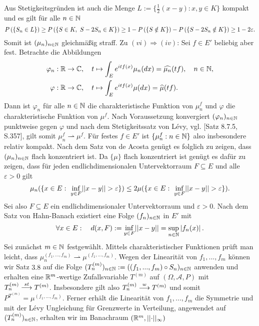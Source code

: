 \begin{proof*}
    Aus Stetigkeitsgründen ist auch die Menge $L := \{\frac{1}{2}(x-y): x,y \in K\}$ kompakt und es gilt für alle $n \in \mathbb{N}$
    $$
        \prob{S_n \in L} \geq \prob{S \in K, \ S-2S_n \in K} \geq 1 - \prob{S \notin K} - \prob{S-2S_n \notin K} \geq 1 - 2\varepsilon. 
    $$ 
    Somit ist $(\mu_n)_{n \in \mathbb{N}}$ gleichmäßig straff. 
    \newline
    Zu $(vi) \Rightarrow (iv)$: 
    Sei $f \in E'$ beliebig aber fest. Betrachte die Abbildungen 
    \begin{align*}
        \varphi_n &: \mathbb{R} \to \mathbb{C}, \quad t \mapsto \int_E e^{itf(x)}\mu_n(dx) = \widehat{\mu_n}(tf), \quad n \in \mathbb{N}, \\\
        \varphi   &: \mathbb{R} \to \mathbb{C}, \quad t \mapsto \int_E e^{itf(x)}\mu(dx) = \widehat{\mu}(tf). 
    \end{align*}
    Dann ist $\varphi_n$ für alle $n \in \mathbb{N}$ die charakteristische Funktion von $\mu_n^{f}$ und $\varphi$ die charakteristische Funktion von $\mu^f$. Nach Voraussetzung konvergiert $(\varphi_n)_{n \in \mathbb{N}}$ punktweise gegen $\varphi$ und nach 
    dem Stetigkeitssatz von Lévy, vgl. \cite{gs}[Satz 8.7.5, S.357], gilt somit $\mu_n^f \rightharpoonup \mu^f$. Für festes $f \in E'$ ist $\{\mu_n^f : n \in \mathbb{N}\}$ also insbesondere relativ kompakt. Nach dem Satz von de Acosta genügt es folglich zu zeigen, dass $(\mu_n)_{n \in \mathbb{N}}$ flach konzentriert ist. 
    Da $\{\mu\}$ flach konzentriert ist genügt es dafür zu zeigen, dass für jeden endlichdimensionalen Untervektorraum $F \subseteq E$ und alle $\varepsilon > 0$ gilt 
    $$
        \mu_n(\{x \in E: \ \inf_{y \in F}\lvert\lvert x-y \rvert\rvert > \varepsilon \}) \leq 2 \mu(\{x \in E: \ \inf_{y \in F}\lvert\lvert x-y \rvert\rvert > \varepsilon \}).
    $$
    Sei also $F \subseteq E$ ein endlichdimensionaler Untervektorraum und $\varepsilon >0$. Nach dem Satz von Hahn-Banach existiert eine Folge $(f_n)_{n \in \mathbb{N}}$ in $E'$ mit 
    $$
        \forall x \in E: \quad d(x,F) := \inf_{y \in F}\lvert\lvert x-y \rvert\rvert = \sup_{n \in \mathbb{N}}\left| f_n(x) \right|. 
    $$
    Sei zunächst $m \in \mathbb{N}$ festgewählt. Mittels charakteristischer Funktionen prüft man leicht, dass $\mu_n^{(f_1,...,f_m)} \rightharpoonup \mu^{(f_1,...,f_m)}$. 
    Wegen der Linearität von $f_1,...,f_m$ können wir Satz $3.8$ auf die Folge $(T_n^{(m)})_{n \in \mathbb{N}} := ((f_1,...,f_m)\circ S_n)_{n \in \mathbb{N}}$ anwenden und erhalten eine $\mathbb{R}^m$-wertige Zufallsvariable $T^{(m)}$ auf $(\Omega, \mathcal{A}, P)$ mit 
    $T_n^{(m)} \overset{st}{\longrightarrow} T^{(m)}$. Insbesondere gilt also $T_n^{(m)} \overset{w}{\longrightarrow} T^{(m)}$ und somit \mbox{$P^{T^{(m)}} = \mu^{(f_1,...,f_m)}$}. 
    Ferner erhält die Linearität von $f_1,...,f_m$ die Symmetrie und mit der Lévy Ungleichung für Grenzwerte in Verteilung, angewendet auf $(T_n^{(m)})_{n \in \mathbb{N}}$, erhalten wir im Banachraum $(\mathbb{R}^m, \lvert\lvert \cdot \rvert\rvert_{\infty})$

\end{proof*}
